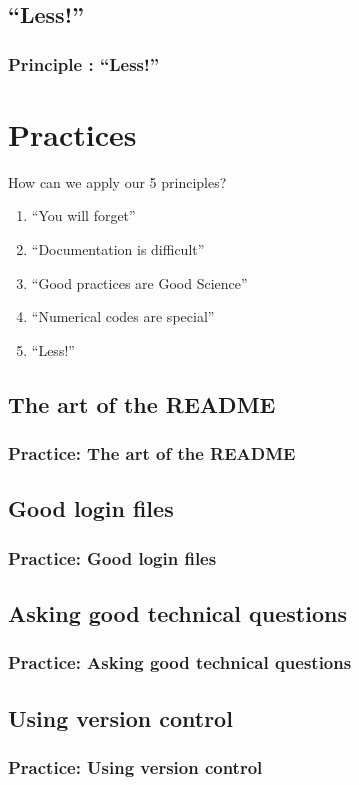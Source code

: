 \documentclass{beamer}
\begin{document}
\subsection{``Less!''}
\begin{frame}[fragile]
\frametitle{Principle : ``Less!''}
\end{frame}

\section{Practices}

\begin{frame}[fragile]
How can we apply our 5 principles?
\begin{enumerate}
\item``You will forget''
\item``Documentation is difficult''
\item``Good practices are Good Science''
\item``Numerical codes are special''
\item``Less!''
\end{enumerate}
\end{frame}

\subsection{The art of the README}
\begin{frame}[fragile]
\frametitle{Practice: The art of the README}
\end{frame}

\subsection{Good login files}
\begin{frame}[fragile]
\frametitle{Practice: Good login files}
\end{frame}

\subsection{Asking good technical questions}
\begin{frame}[fragile]
\frametitle{Practice: Asking good technical questions}
\end{frame}

\subsection{Using version control}
\begin{frame}[fragile]
\frametitle{Practice: Using version control}
\end{frame}
\end{document}
